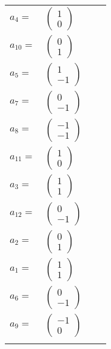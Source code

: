 \documentclass[1p]{elsarticle_modified}
\theoremstyle{definition}
\begin{document}
\begin{tabular}{m{7pt} m{180pt} m{7pt} m{180pt} }
\flushright $a_{4}=$&$\begin{pmatrix}1\\0\end{pmatrix}$ \\
\flushright $a_{10}=$&$\begin{pmatrix}0\\1\end{pmatrix}$ \\
\flushright $a_{5}=$&$\begin{pmatrix}1\\-1\end{pmatrix}$ \\
\flushright $a_{7}=$&$\begin{pmatrix}0\\-1\end{pmatrix}$ \\
\flushright $a_{8}=$&$\begin{pmatrix}-1\\-1\end{pmatrix}$ \\
\flushright $a_{11}=$&$\begin{pmatrix}1\\0\end{pmatrix}$ \\
\flushright $a_{3}=$&$\begin{pmatrix}1\\1\end{pmatrix}$ \\
\flushright $a_{12}=$&$\begin{pmatrix}0\\-1\end{pmatrix}$ \\
\flushright $a_{2}=$&$\begin{pmatrix}0\\1\end{pmatrix}$ \\
\flushright $a_{1}=$&$\begin{pmatrix}1\\1\end{pmatrix}$ \\
\flushright $a_{6}=$&$\begin{pmatrix}0\\-1\end{pmatrix}$ \\
\flushright $a_{9}=$&$\begin{pmatrix}-1\\0\end{pmatrix}$\\&\end{tabular}
\end{document}
